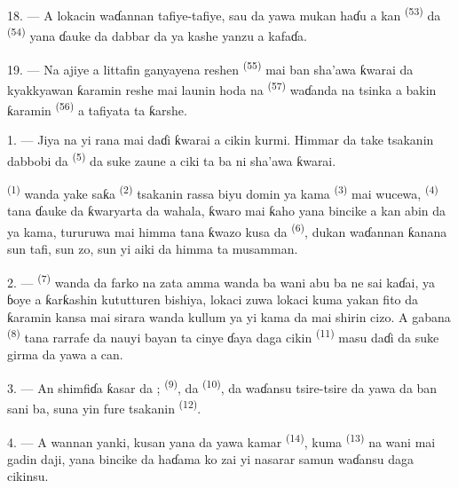 18. --- A lokacin waɗannan tafiye-tafiye, sau da yawa mukan haɗu a kan
 \textsuperscript{(53)} da  \textsuperscript{(54)} yana ɗauke da dabbar da ya kashe yanzu
a kafaɗa.

19. --- Na ajiye a littafin ganyayena reshen 
\textsuperscript{(55)} mai ban sha’awa ƙwarai da kyakkyawan ƙaramin
reshe mai launin hoda na  \textsuperscript{(57)}
waɗanda na tsinka a bakin ƙaramin  \textsuperscript{(56)} a
tafiyata ta ƙarshe.

\VUsaut{3.0mm}
\VUsaut{3.0mm}

\VUsaut{3.0mm}

1. --- Jiya na yi rana mai daɗi ƙwarai a cikin kurmi. Himmar da take
tsakanin dabbobi da  \textsuperscript{(5)} da suke zaune a
ciki ta ba ni sha’awa ƙwarai.

 \textsuperscript{(1)} wanda yake saƙa 
\textsuperscript{(2)} tsakanin rassa biyu domin ya kama 
\textsuperscript{(3)} mai wucewa, 
\textsuperscript{(4)} tana ɗauke da ƙwaryarta da wahala, ƙwaro mai ƙaho
yana bincike a kan abin da ya kama, tururuwa mai himma tana ƙwazo kusa
da  \textsuperscript{(6)}, dukan waɗannan ƙanana
sun tafi, sun zo, sun yi aiki da himma ta musamman.

2. ---  \textsuperscript{(7)} wanda da farko na zata
 amma wanda ba wani abu ba ne sai
 kaɗai, ya ɓoye a ƙarƙashin kututturen
bishiya, lokaci zuwa lokaci kuma yakan fito da ƙaramin kansa mai
sirara wanda kullum ya yi kama da mai shirin cizo. A gabana
 \textsuperscript{(8)} tana rarrafe da nauyi
bayan ta cinye ɗaya daga cikin 
\textsuperscript{(11)} masu daɗi da suke girma da yawa a can.

3. --- An shimfiɗa ƙasar da  ;
 \textsuperscript{(9)}, da  \textsuperscript{(10)}, da waɗansu tsire-tsire da yawa da ban sani
ba, suna yin fure tsakanin 
\textsuperscript{(12)}.

4. --- A wannan yanki,  kusan yana da yawa
kamar  \textsuperscript{(14)}, kuma 
\textsuperscript{(13)} na wani mai gadin daji, yana bincike da haɗama ko
zai yi nasarar samun waɗansu daga cikinsu.

